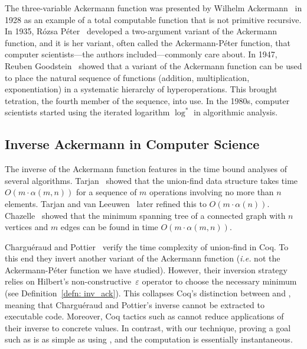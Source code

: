 The three-variable Ackermann function was presented by Wilhelm Ackermann~\cite{ackermann} in 1928 as an example of a total computable function that is not primitive recursive.
In 1935, Rózsa Péter~\cite{peter} developed a two-argument variant of the Ackermann 
function, and it is her variant, often called the Ackermann-Péter function,
that computer scientists---the authors included---commonly care about.
In 1947, Reuben Goodstein~\cite{goodstein} showed that a variant of the Ackermann function 
can be used to place the natural sequence of functions (addition, multiplication,
exponentiation) in a systematic hierarchy of hyperoperations. 
This brought tetration, the fourth member of the sequence, into use.
In the 1980s, computer scientists started using the
iterated logarithm $\log^*$ in algorithmic analysis.

\subsection{Inverse Ackermann in Computer Science}

The inverse of the Ackermann function
features in the time bound analyses of several algorithms.
Tarjan~\cite{tarjan} showed that the union-find data structure
takes time \mbox{$O(m\cdot\alpha(m,n))$} for a sequence of $m$ operations
involving no more than $n$ elements.
Tarjan and van Leeuwen~\cite{tarjan2} later refined this to $O(m\cdot\alpha(n))$.
Chazelle~\cite{chazelle} showed that the minimum spanning tree
of a connected graph with $n$ vertices and $m$ edges
can be found in time $O(m\cdot\alpha(m,n))$.

Chargu\'eraud and Pottier~\cite{charpott}
verify the time complexity of union-find in Coq.
To this end they invert another variant of the Ackermann function 
(\emph{i.e.} not the Ackermann-Péter function we have 
studied). 
However, their inversion strategy 
relies on Hilbert's non-constructive~$\varepsilon$ operator 
to choose the necessary minimum (see Definition~\ref{defn: inv_ack}). 
This collapses Coq's distinction between  and , meaning that
Chargu\'eraud and Pottier's 
inverse cannot be extracted to executable code.  Moreover, 
Coq tactics such as  cannot reduce applications of
their inverse to concrete values.  In contrast, with our technique,
proving a goal such as  is as simple as 
using , and the computation is essentially instantaneous.

